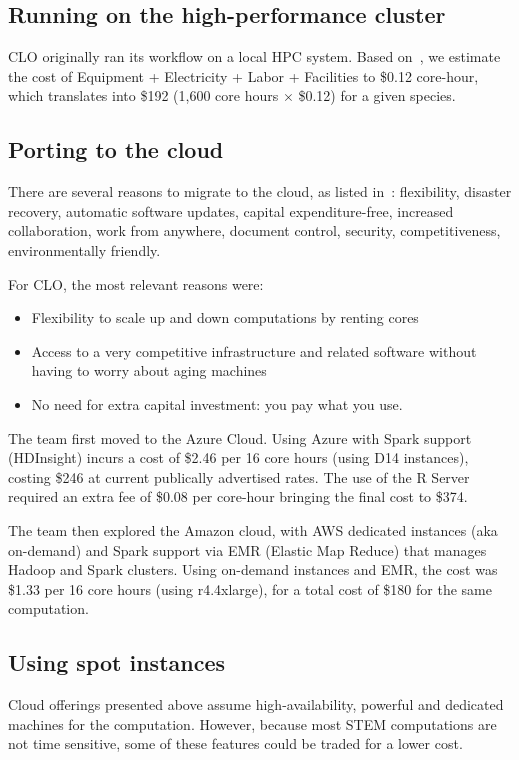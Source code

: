 \documentclass{acm_proc_article-sp}
\begin{document}
\subsection{Running on the high-performance cluster}
CLO originally ran its workflow on a local HPC system. Based on~\cite{Spagnuolo_undated-ih}, we estimate the cost of Equipment + Electricity + Labor + Facilities to \$0.12 core-hour, which translates into \$192 (1,600 core hours $\times$ \$0.12) for a given species.

\subsection{Porting to the cloud}
There are several reasons to migrate to the cloud, as listed in~\cite{noauthor_undated-ne}: flexibility, disaster recovery, automatic software updates, capital expenditure-free, increased collaboration, work from anywhere, document control, security, competitiveness, environmentally friendly.

For CLO, the most relevant reasons were:
\begin{itemize}[noitemsep, topsep=-5pt]
\item Flexibility to scale up and down computations by renting cores 
\item Access to a very competitive infrastructure and related software without having to worry about aging machines
\item No need for extra capital investment: you pay what you use.
\end{itemize}

The team first moved to the Azure Cloud. Using Azure with Spark support (HDInsight) incurs a cost of \$2.46 per 16 core hours (using D14 instances), costing \$246 at current publically advertised rates. The use of the R Server required an extra fee of \$0.08 per core-hour bringing the final cost to \$374.

The team then explored the Amazon cloud, with AWS dedicated instances (aka on-demand) and Spark support via EMR (Elastic Map Reduce) that manages Hadoop and Spark clusters. Using on-demand instances and EMR, the cost was  \$1.33 per 16 core hours (using r4.4xlarge), for a total cost of  \$180 for the same computation.

\subsection{Using spot instances}
Cloud offerings presented above assume high-availability, powerful and dedicated machines for the computation. However, because most STEM computations are not time sensitive, some of these features could be traded for a lower cost.
\end{document}

